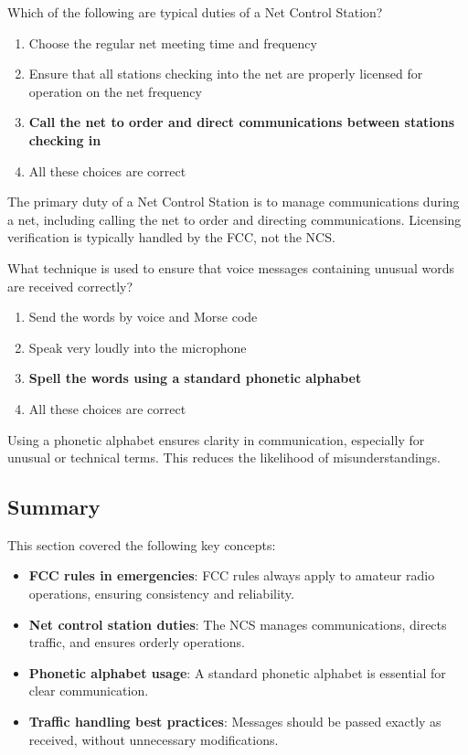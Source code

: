 
\begin{tcolorbox}[colback=gray!10!white,colframe=black!75!black,title={T2C02}]
    Which of the following are typical duties of a Net Control Station?
    \begin{enumerate}[label=\Alph*,noitemsep]
        \item Choose the regular net meeting time and frequency
        \item Ensure that all stations checking into the net are properly licensed for operation on the net frequency
        \item \textbf{Call the net to order and direct communications between stations checking in}
        \item All these choices are correct
    \end{enumerate}
\end{tcolorbox}
The primary duty of a Net Control Station is to manage communications during a net, including calling the net to order and directing communications. Licensing verification is typically handled by the FCC, not the NCS.


\begin{tcolorbox}[colback=gray!10!white,colframe=black!75!black,title={T2C03}]
    What technique is used to ensure that voice messages containing unusual words are received correctly?
    \begin{enumerate}[label=\Alph*,noitemsep]
        \item Send the words by voice and Morse code
        \item Speak very loudly into the microphone
        \item \textbf{Spell the words using a standard phonetic alphabet}
        \item All these choices are correct
    \end{enumerate}
\end{tcolorbox}
Using a phonetic alphabet ensures clarity in communication, especially for unusual or technical terms. This reduces the likelihood of misunderstandings.


\subsection*{Summary}
This section covered the following key concepts:
\begin{itemize}
    \item \textbf{FCC rules in emergencies}: FCC rules always apply to amateur radio operations, ensuring consistency and reliability.
    \item \textbf{Net control station duties}: The NCS manages communications, directs traffic, and ensures orderly operations.
    \item \textbf{Phonetic alphabet usage}: A standard phonetic alphabet is essential for clear communication.
    \item \textbf{Traffic handling best practices}: Messages should be passed exactly as received, without unnecessary modifications.
\end{itemize}
